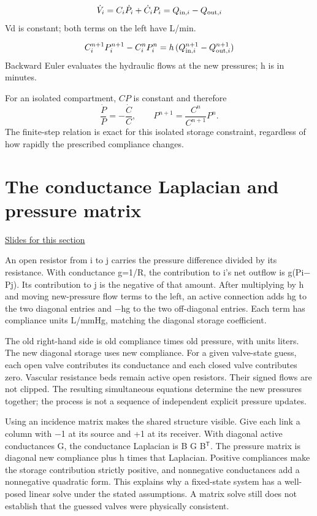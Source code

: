 \documentclass[11pt,letterpaper]{article}
\theoremstyle{definition}\newtheorem{definition}{Definition}\newtheorem{example}{Example}
\numberwithin{equation}{section}
\begin{document}
\[
\dot V_i=C_i\dot P_i+\dot C_iP_i=Q_{{\rm in},i}-Q_{{\rm out},i}
\]
Vd is constant; both terms on the left have L/min.

\[
C_i^{n+1}P_i^{n+1}-C_i^nP_i^n=h\,(Q_{{\rm in},i}^{n+1}-Q_{{\rm out},i}^{n+1})
\]
Backward Euler evaluates the hydraulic flows at the new pressures; h is in minutes.

For an isolated compartment, $CP$ is constant and therefore
\[
 \frac{\dot P}{P}=-\frac{\dot C}{C},\qquad
 P^{n+1}=\frac{C^n}{C^{n+1}}P^n.
\]
The finite-step relation is exact for this isolated storage constraint, regardless of how rapidly the prescribed compliance changes.
\section{The conductance Laplacian and pressure matrix}
\hypertarget{note-the-conductance-laplacian-and-pressure-matrix}{}\label{note:the-conductance-laplacian-and-pressure-matrix}
{\small \href{slides.html\#frame=discretize-stressed-volume\&step=1}{Slides for this section}}\par
An open resistor from i to j carries the pressure difference divided by its resistance. With conductance g=1/R, the contribution to i's net outflow is g(Pi\ensuremath{-}Pj). Its contribution to j is the negative of that amount. After multiplying by h and moving new-pressure flow terms to the left, an active connection adds hg to the two diagonal entries and \ensuremath{-}hg to the two off-diagonal entries. Each term has compliance units L/mmHg, matching the diagonal storage coefficient.

The old right-hand side is old compliance times old pressure, with units liters. The new diagonal storage uses new compliance. For a given valve-state guess, each open valve contributes its conductance and each closed valve contributes zero. Vascular resistance beds remain active open resistors. Their signed flows are not clipped. The resulting simultaneous equations determine the new pressures together; the process is not a sequence of independent explicit pressure updates.

Using an incidence matrix makes the shared structure visible. Give each link a column with \ensuremath{-}1 at its source and +1 at its receiver. With diagonal active conductances G, the conductance Laplacian is B G B\ensuremath{^{\mathsf T}}. The pressure matrix is diagonal new compliance plus h times that Laplacian. Positive compliances make the storage contribution strictly positive, and nonnegative conductances add a nonnegative quadratic form. This explains why a fixed-state system has a well-posed linear solve under the stated assumptions. A matrix solve still does not establish that the guessed valves were physically consistent.
\end{document}
